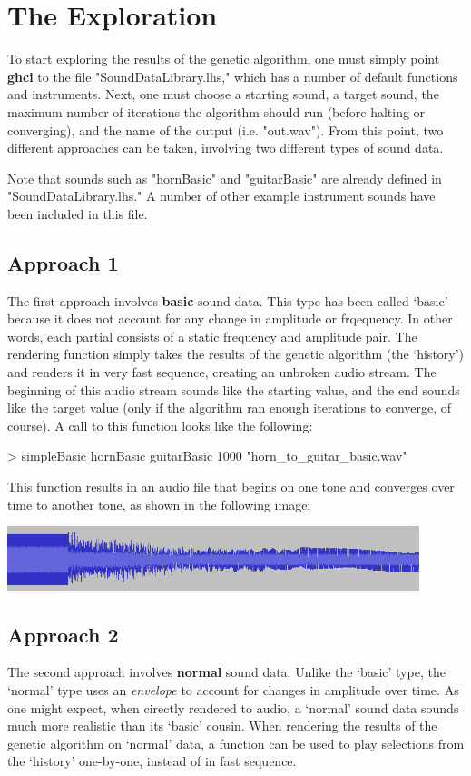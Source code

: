 \documentclass[11pt]{article}
\begin{document}
\section{The Exploration}
To start exploring the results of the genetic algorithm, one must simply point {\bf ghci} to the file "SoundDataLibrary.lhs," which has a number of default functions and instruments. Next, one must choose a starting sound, a target sound, the maximum number of iterations the algorithm should run (before halting or converging), and the name of the output (i.e. "out.wav"). 
From this point, two different approaches can be taken, involving two different types of sound data.

Note that sounds such as "hornBasic" and "guitarBasic" are already defined in "SoundDataLibrary.lhs." A number of other example instrument sounds have been included in this file.

\subsection{Approach 1}
The first approach involves {\bf basic} sound data. This type has been called `basic' because it does not account for any change in amplitude or frqequency. In other words, each partial consists of a static frequency and amplitude pair. The rendering function simply takes the results of the genetic algorithm (the `history') and renders it in very fast sequence, creating an unbroken audio stream. The beginning of this audio stream sounds like the starting value, and the end sounds like the target value (only if the algorithm ran enough iterations to converge, of course).
A call to this function looks like the following:
\begin{code}
> simpleBasic hornBasic guitarBasic 1000 "horn_to_guitar_basic.wav"
\end{code}
This function results in an audio file that begins on one tone and converges over time to another tone, as shown in the following image:

\includegraphics[width=120mm]{basic_wav.png}

\subsection{Approach 2}
The second approach involves {\bf normal} sound data. Unlike the `basic' type, the `normal' type uses an \emph{envelope} to account for changes in amplitude over time. As one might expect, when cirectly rendered to audio, a `normal' sound data sounds much more realistic than its `basic' cousin. When rendering the results of the genetic algorithm on `normal' data, a function can be used to play selections from the `history' one-by-one, instead of in fast sequence.
\end{document}

